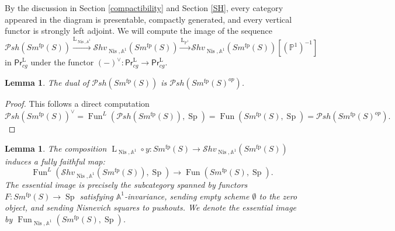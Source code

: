 \documentclass{article}
\newtheorem{lm}[thm]{Lemma}
\theoremstyle{definition}
\newcommand{\on}{\operatorname}
\newcommand{\PrL}{\mathsf{Pr}^\mathrm{L} }
\begin{document}
By the discussion in Section \ref{compactibility} and Section \ref{SH}, every category appeared in the diagram is presentable, compactly generated, and every vertical functor is strongly left adjoint. We will compute the image of the sequence\[
\mathcal{P}sh(Sm^{\on{fp}}(S))\xrightarrow{\on{L}_{\on{Nis},\mathbb{A}^1}}\mathcal{S}hv_{\on{Nis},\mathbb{A}^1}(Sm^{\on{fp}}(S))\xrightarrow{\on{L}_{\mathbb{P}^1}}\mathcal{S}hv_{\on{Nis},\mathbb{A}^1}(Sm^{\on{fp}}(S))[(\mathbb{P}^1)^{-1}]
\]
in $\PrL_{cg}$ under the functor $(-)^{\vee}:\PrL_{cg}\rightarrow\PrL_{cg}$.
\begin{lm}\label{id1}
The dual of $\mathcal{P}sh(Sm^{\on{fp}}(S))$ is $\mathcal{P}sh(Sm^{\on{fp}}(S)^{op})$.
\end{lm}
\begin{proof}
This follows a direct computation 
\[\mathcal{P}sh(Sm^{\on{fp}}(S))^{\vee}=\on{Fun}^L(\mathcal{P}sh(Sm^{\on{fp}}(S)),\on{Sp})=\on{Fun}(Sm^{\on{fp}}(S),\on{Sp})=\mathcal{P}sh(Sm^{\on{fp}}(S)^{op}).\]
\end{proof}
\begin{lm}\label{id2}
The composition $\on{L}_{\on{Nis},\mathbb{A}^1}\circ y: Sm^{\on{fp}}(S)\rightarrow\mathcal{S}hv_{\on{Nis},\mathbb{A}^1}(Sm^{\on{fp}}(S))$ induces a fully faithful map:\[
\on{Fun}^L(\mathcal{S}hv_{\on{Nis},\mathbb{A}^1}(Sm^{\on{fp}}(S)),\on{Sp})\rightarrow\on{Fun}(Sm^{\on{fp}}(S),\on{Sp}).\]
The essential image is precisely the subcategory spanned by functors $F: Sm^{\on{fp}}(S)\rightarrow\on{Sp}$ satisfying $\mathbb{A}^1$-invariance, sending empty scheme $\emptyset$ to the zero object, and sending Nisnevich squares to pushouts. We denote the essential image by $\on{Fun}_{\on{Nis},\mathbb{A}^1}(Sm^{\on{fp}}(S),\on{Sp})$.
\end{lm}
\end{document}

